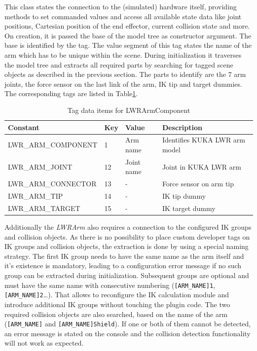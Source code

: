 This class states the connection to the (simulated) hardware itself, providing methods to set commanded values and access all available state data like joint positions, Cartesian position of the end effector, current collision state and more. On creation, it is passed the base of the model tree as constructor argument. The base is identified by the  tag. The value segment of this tag states the name of the arm which has to be unique within the scene. During initialization it traverses the model tree and extracts all required parts by searching for tagged scene objects as described in the previous section. The parts to identify are the 7 arm joints, the force sensor on the last link of the arm, IK tip and target dummies. The corresponding tags are listed in Table\ref{fig:lwr_tags}.
\begin{table}[ht]
  \centering
  \begin{tabularx}{\textwidth}{|l|l|l|X|} \hline
	\textbf{Constant} & \textbf{Key} & \textbf{Value} & \textbf{Description} \\ \hline
	LWR\_ARM\_COMPONENT & 1 & Arm name & Identifies KUKA LWR arm model \\
	LWR\_ARM\_JOINT & 12 & Joint name & Joint in KUKA LWR arm \\
	LWR\_ARM\_CONNECTOR & 13 & - & Force sensor on arm tip \\
	LWR\_ARM\_TIP & 14 & - & IK tip dummy \\
	LWR\_ARM\_TARGET & 15 & - & IK target dummy  \\ \hline
  \end{tabularx}
  \caption{Tag data items for LWRArmComponent}
  \label{fig:lwr_tags}
\end{table}
Additionally the \emph{LWRArm} also requires a connection to the configured IK groups and collision objects. As there is no possibility to place custom developer tags on IK groups and collision objects, the extraction is done by using a special naming strategy. The first IK group needs to have the same name as the arm itself and it's existence is mandatory, leading to a configuration error message if no such group can be extracted during initialization. Subsequent groups are optional and must have the same name with consecutive numbering (\texttt{[ARM\_NAME]1}, \texttt{[ARM\_NAME]2}\ldots). That allows to reconfigure the IK calculation module and introduce additional IK groups without touching the plugin code. The two required collision objects are also searched, based on the name of the arm (\texttt{[ARM\_NAME]} and \texttt{[ARM\_NAME]Shield}). If one or both of them cannot be detected, an error message is stated on the console and the collision detection functionality will not work as expected. \\

